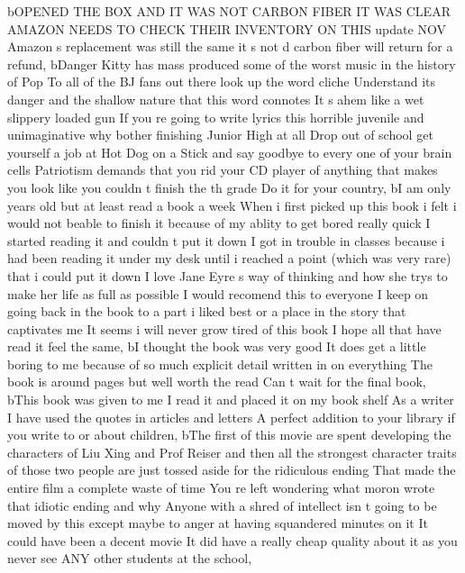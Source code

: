 \documentclass[
]{article}
\newenvironment{Shaded}{}{}
\newcommand{\NormalTok}[1]{#1}
\newcommand{\StringTok}[1]{\textcolor[rgb]{0.25,0.44,0.63}{#1}}
\begin{document}
\begin{Shaded}
\begin{Highlighting}[]
\NormalTok{       b}\StringTok{\textquotesingle{}OPENED THE BOX AND IT WAS NOT CARBON FIBER IT WAS CLEAR AMAZON NEEDS TO CHECK THEIR INVENTORY ON THIS update NOV Amazon s replacement was still the same it s not d carbon fiber will return for a refund\textquotesingle{}}\NormalTok{,}
\NormalTok{       b}\StringTok{\textquotesingle{}Danger Kitty has mass produced some of the worst music in the history of Pop To all of the BJ fans out there look up the word cliche Understand its danger and the shallow nature that this word connotes It s ahem like a wet slippery loaded gun If you re going to write lyrics this horrible juvenile and unimaginative why bother finishing Junior High at all Drop out of school get yourself a job at Hot Dog on a Stick and say goodbye to every one of your brain cells Patriotism demands that you rid your CD player of anything that makes you look like you couldn t finish the th grade Do it for your country\textquotesingle{}}\NormalTok{,}
\NormalTok{       b}\StringTok{\textquotesingle{}I am only years old but at least read a book a week When i first picked up this book i felt i would not beable to finish it because of my ablity to get bored really quick I started reading it and couldn t put it down I got in trouble in classes because i had been reading it under my desk until i reached a point (which was very rare) that i could put it down I love Jane Eyre s way of thinking and how she trys to make her life as full as possible I would recomend this to everyone I keep on going back in the book to a part i liked best or a place in the story that captivates me It seems i will never grow tired of this book I hope all that have read it feel the same\textquotesingle{}}\NormalTok{,}
\NormalTok{       b}\StringTok{\textquotesingle{}I thought the book was very good It does get a little boring to me because of so much explicit detail written in on everything The book is around pages but well worth the read Can t wait for the final book\textquotesingle{}}\NormalTok{,}
\NormalTok{       b}\StringTok{\textquotesingle{}This book was given to me I read it and placed it on my book shelf As a writer I have used the quotes in articles and letters A perfect addition to your library if you write to or about children\textquotesingle{}}\NormalTok{,}
\NormalTok{       b}\StringTok{\textquotesingle{}The first of this movie are spent developing the characters of Liu Xing and Prof Reiser and then all the strongest character traits of those two people are just tossed aside for the ridiculous ending That made the entire film a complete waste of time You re left wondering what moron wrote that idiotic ending and why Anyone with a shred of intellect isn t going to be moved by this except maybe to anger at having squandered minutes on it It could have been a decent movie It did have a really cheap quality about it as you never see ANY other students at the school\textquotesingle{}}\NormalTok{,}

\end{Highlighting}
\end{Shaded}
\end{document}
